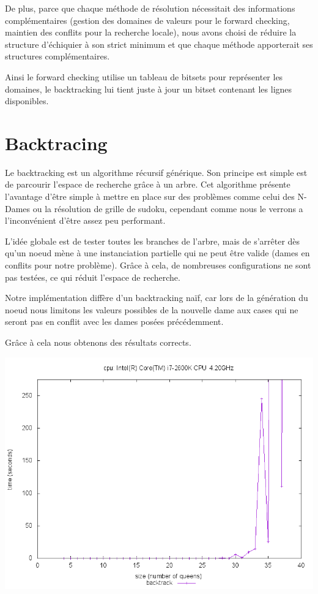 \documentclass[10pt,a4paper]{report}
\begin{document}
De plus, parce que chaque méthode de résolution nécessitait des informations complémentaires (gestion des domaines de valeurs pour le forward checking, maintien des conflits pour la recherche locale),
nous avons choisi de réduire la structure d'échiquier à son strict minimum et que chaque méthode apporterait ses structures complémentaires.

Ainsi le forward checking utilise un tableau de bitsets pour représenter les domaines, le backtracking lui tient juste à jour un bitset contenant les lignes disponibles.


\section{Backtracing}

Le backtracking est un algorithme récursif générique. Son principe est simple est de parcourir l'espace de recherche grâce à un arbre.
Cet algorithme présente l'avantage d'être simple à mettre en place sur des problèmes comme celui des N-Dames ou la résolution de grille de sudoku, cependant comme nous le verrons a l'inconvénient d'être assez peu performant.

L'idée globale est de tester toutes les branches de l'arbre, mais de s'arrêter dès qu'un noeud mène à une instanciation partielle qui ne peut être valide (dames en conflits pour notre problème).
Grâce à cela, de nombreuses configurations ne sont pas testées, ce qui réduit l'espace de recherche.

Notre implémentation diffère d'un backtracking naïf, car lors de la génération du noeud nous limitons les valeurs possibles de la nouvelle dame aux cases qui ne seront pas en conflit avec les dames posées précédemment.

Grâce à cela nous obtenons des résultats corrects.

\includegraphics[width=1\textwidth]{images/plot_bt_i7.png}
\end{document}
